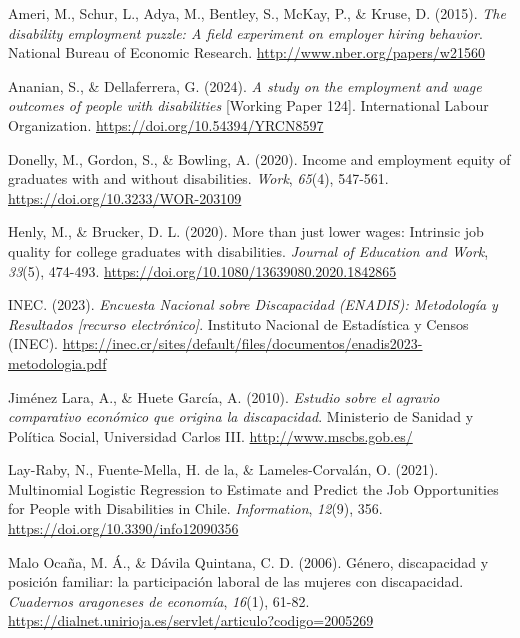\documentclass[
  11pt,
  oneside]{article}
\newlength{\cslhangindent}
\newenvironment{CSLReferences}[2] %
 {\begin{list}{}{%
  \setlength{\itemindent}{0pt}
  \setlength{\leftmargin}{0pt}
  \setlength{\parsep}{0pt}
  \ifodd #1
   \setlength{\leftmargin}{\cslhangindent}
   \setlength{\itemindent}{-1\cslhangindent}
  \fi
  \setlength{\itemsep}{#2\baselineskip}}}
 {\end{list}}
\begin{document}
\label{refs}
\begin{CSLReferences}{1}{0}
Ameri, M., Schur, L., Adya, M., Bentley, S., McKay, P., \& Kruse, D.
(2015). \emph{The disability employment puzzle: A field experiment on
employer hiring behavior}. National Bureau of Economic Research.
\url{http://www.nber.org/papers/w21560}

Ananian, S., \& Dellaferrera, G. (2024). \emph{A study on the employment
and wage outcomes of people with disabilities} {[}Working Paper 124{]}.
International Labour Organization.
\url{https://doi.org/10.54394/YRCN8597}

Donelly, M., Gordon, S., \& Bowling, A. (2020). Income and employment
equity of graduates with and without disabilities. \emph{Work},
\emph{65}(4), 547-561. \url{https://doi.org/10.3233/WOR-203109}

Henly, M., \& Brucker, D. L. (2020). More than just lower wages:
Intrinsic job quality for college graduates with disabilities.
\emph{Journal of Education and Work}, \emph{33}(5), 474-493.
\url{https://doi.org/10.1080/13639080.2020.1842865}

INEC. (2023). \emph{Encuesta {Nacional} sobre {Discapacidad} ({ENADIS}):
{Metodología} y {Resultados} {[}recurso electrónico{]}}. Instituto
Nacional de Estadística y Censos ({INEC}).
\url{https://inec.cr/sites/default/files/documentos/enadis2023-metodologia.pdf}

Jiménez Lara, A., \& Huete García, A. (2010). \emph{Estudio sobre el
agravio comparativo económico que origina la discapacidad}. Ministerio
de Sanidad y Política Social, Universidad Carlos III.
\url{http://www.mscbs.gob.es/}

Lay-Raby, N., Fuente-Mella, H. de la, \& Lameles-Corvalán, O. (2021).
Multinomial Logistic Regression to Estimate and Predict the Job
Opportunities for People with Disabilities in Chile. \emph{Information},
\emph{12}(9), 356. \url{https://doi.org/10.3390/info12090356}

Malo Ocaña, M. Á., \& Dávila Quintana, C. D. (2006). Género,
discapacidad y posición familiar: la participación laboral de las
mujeres con discapacidad. \emph{Cuadernos aragoneses de economía},
\emph{16}(1), 61-82.
\url{https://dialnet.unirioja.es/servlet/articulo?codigo=2005269}


\end{CSLReferences}
\end{document}
